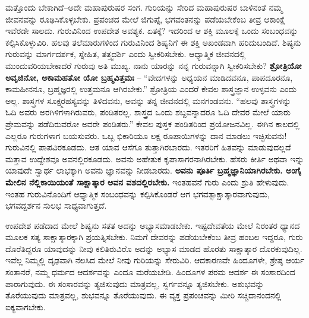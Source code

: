 ಮತ್ತೊಂದು ಬೇಕಾಗಿದೆ–ಅದೇ ಮಹಾಪುರುಷರ ಸಂಗ. ಗುರಿಯನ್ನು ಸೇರಿದ ಮಹಾಪುರುಷರ ಬಾಳಿನಂತೆ ನಮ್ಮ ಜೀವನವನ್ನು ರೂಢಿಸಿಕೊಳ್ಳಬೇಕು. ಪ್ರಪಂಚದ ಮೇಲೆ ಜಿಗುಪ್ಸೆ, ಭಗವಂತನನ್ನು ಪಡೆಯಬೇಕೆಂಬ ತೀವ್ರ ಆಕಾಂಕ್ಷೆ ಇವೆರಡೇ ಸಾಲದು. ಗುರುವಿನಿಂದ ಉಪದೇಶ ಅವಶ್ಯಕ. ಏತಕ್ಕೆ? ಇದರಿಂದ ಆ ಶಕ್ತಿ ಮೂಲಕ್ಕೆ ಒಂದು ಸಂಬಂಧವನ್ನು ಕಲ್ಪಿಸಿಕೊಳ್ಳುವಿರಿ. ಹಲವು ತಲೆಮಾರುಗಳಿಂದ ಗುರುವಿನಿಂದ ಶಿಷ್ಯನಿಗೆ ಈ ಶಕ್ತಿ ಅಖಂಡವಾಗಿ ಹರಿದುಬಂದಿದೆ. ಶಿಷ್ಯನು ಗುರುವನ್ನು ಮಾರ್ಗದರ್ಶಕ, ಸ್ನೇಹಿತ, ತತ್ತ್ವದರ್ಶಿ ಎಂದು ಸ್ವೀಕರಿಸಬೇಕು. ಆಧ್ಯಾತ್ಮಿಕ ಜೀವನದಲ್ಲಿ ಮುಂದುವರಿಯಬೇಕಾದರೆ ಗುರುವು ಅತಿ ಮುಖ್ಯ. ನಾನು ಯಾರನ್ನು ನನ್ನ ಗುರುವನ್ನಾಗಿ ಸ್ವೀಕರಿಸಬೇಕು? \textbf{ಶ್ರೋತ್ರಿಯೋ ಅವೃಜಿನೋ, ಅಕಾಮಹತೋ ಯೋ ಬ್ರಹ್ಮವಿತ್ತಮಃ} – “ವೇದಗಳನ್ನು ಅಧ್ಯಯನ ಮಾಡಿದವನೂ, ಪಾಪದೂರನೂ, ಕಾಮಹೀನನೂ, ಬ್ರಹ್ಮಜ್ಞರಲ್ಲಿ ಉತ್ತಮನೂ ಆಗಿರಬೇಕು.” ಶ್ರೋತ್ರಿಯ ಎಂದರೆ ಕೇವಲ ಶಾಸ್ತ್ರಜ್ಞಾನ ಉಳ್ಳವನು ಎಂದು ಅಲ್ಲ. ಶಾಸ್ತ್ರಗಳ ಸೂಕ್ಷ್ಮರಹಸ್ಯವನ್ನು ತಿಳಿದವನು, ಅವನ್ನು ತನ್ನ ಜೀವನದಲ್ಲಿ ಮನಗಂಡವನು. “ಹಲವು ಶಾಸ್ತ್ರಗಳನ್ನು ಓದಿ ಅವರು ಅರಗಿಳಿಗಳಾಗಿರುವರು, ಪಂಡಿತರಲ್ಲ. ಶಾಸ್ತ್ರದ ಒಂದು ಶಬ್ದವನ್ನಾದರೂ ಓದಿ ದೇವರ ಮೇಲೆ ಯಾರು ಪ್ರೇಮವನ್ನು ಪಡೆದಿರುವರೋ ಅವರೇ ಪಂಡಿತರು.” ಕೇವಲ ಪುಸ್ತಕ ಪಂಡಿತರಿಂದ ಪ್ರಯೋಜನವಿಲ್ಲ. ಈಗಿನ ಕಾಲದಲ್ಲಿ ಎಲ್ಲರೂ ಗುರುಗಳಾಗ ಬಯಸುವರು. ಒಬ್ಬ ಭಿಕಾರಿಯೂ ಲಕ್ಷ ರೂಪಾಯಿಗಳನ್ನು ದಾನ ಮಾಡಲು ಇಚ್ಛಿಸುವನು! ಗುರುವಿನಲ್ಲಿ ಪಾಪವಿರಕೂಡದು. ಆತ ಯಾವ ಆಸೆಗೂ ತುತ್ತಾಗಿರಬಾರದು. ಇತರರಿಗೆ ಹಿತವನ್ನು ಮಾಡುವುದಲ್ಲದೆ ಮತ್ತಾವ ಉದ್ದೇಶವೂ ಅವನಲ್ಲಿರಕೂಡದು. ಅವನು ಅಹೇತುಕ ಕೃಪಾಸಾಗರನಾಗಿರಬೇಕು. ಹೆಸರು ಕೀರ್ತಿ ಅಥವಾ ಇನ್ನು ಯಾವುದೇ ಸ್ವಾರ್ಥ ಲಾಭಕ್ಕಾಗಿ ಅವನು ಜ್ಞಾನವನ್ನು ನೀಡಬಾರದು. \textbf{ಅವನು ಪೂರ್ತಿ ಬ್ರಹ್ಮಜ್ಞಾನಿಯಾಗಿರಬೇಕು. ಅಂಗೈ ಮೇಲಿನ ನೆಲ್ಲಿಕಾಯಿಯಂತೆ ಸಾಕ್ಷಾತ್ಕಾರ ಅವನ ವಶದಲ್ಲಿರಬೇಕು.} ಇಂತಹವನೆ ಗುರು ಎಂದು ಶ್ರುತಿ ಹೇಳುವುದು. ಇಂತಹ ಗುರುವಿನೊಂದಿಗೆ ಆಧ್ಯಾತ್ಮಿಕ ಸಂಬಂಧವನ್ನು ಕಲ್ಪಿಸಿಕೊಂಡರೆ ಆಗ ಭಗವತ್ಸಾಕ್ಷಾತ್ಕಾರವಾಗುವುದು, ಭಗವದ್ದರ್ಶನ ಸುಲಭ ಸಾಧ್ಯವಾಗುತ್ತದೆ.

\vskip 5pt

ಉಪದೇಶ ಪಡೆದಾದ ಮೇಲೆ ಶಿಷ್ಯನು ಸತತ ಅದನ್ನು ಅಭ್ಯಾಸಮಾಡಬೇಕು. ಇಷ್ಟದೇವತೆಯ ಮೇಲೆ ನಿರಂತರ ಧ್ಯಾನದ ಮೂಲಕ ಸತ್ಯ ಸಾಕ್ಷಾತ್ಕಾರಕ್ಕಾಗಿ ಪ್ರಯತ್ನಿಸಬೇಕು. ನಿಮಗೆ ದೇವರನ್ನು ಪಡೆಯಬೇಕೆಂಬ ತೀವ್ರ ಹಂಬಲ ಇದ್ದರೂ, ಗುರು ದೊರೆತಿದ್ದರೂ ಯಾವುದನ್ನು ನೀವು ಕಲಿತಿರುವಿರೊ ಅದನ್ನು ಅಭ್ಯಾಸ ಮಾಡದ ಹೊರತು ಸಾಕ್ಷಾತ್ಕಾರ ದೊರಕುವುದಿಲ್ಲ. ಇವೆಲ್ಲ ನಿಮ್ಮಲ್ಲಿ ದೃಢವಾಗಿ ನೆಲಸಿದ ಮೇಲೆ ನೀವು ಗುರಿಯನ್ನು ಸೇರುವಿರಿ. ಆದಕಾರಣವೇ ಹಿಂದೂಗಳೇ, ಶ್ರೇಷ್ಠ ಆರ್ಯ ಸಂತಾನರೆ, ನಮ್ಮ ಧರ್ಮದ ಆದರ್ಶವನ್ನು ಎಂದೂ ಮರೆಯಬೇಡಿ. ಹಿಂದೂಗಳ ಪರಮ ಆದರ್ಶ ಈ ಸಂಸಾರದಿಂದ ಪಾರಾಗುವುದು. ಈ ಸಂಸಾರವನ್ನು ತ್ಯಜಿಸುವುದು ಮಾತ್ರವಲ್ಲ, ಸ್ವರ್ಗವನ್ನೂ ತ್ಯಜಿಸಬೇಕು. ಅಶುಭವನ್ನು ತೊರೆಯುವುದು ಮಾತ್ರವಲ್ಲ, ಶುಭವನ್ನೂ ತೊರೆಯುವುದು. ಈ ವ್ಯಕ್ತ ಪ್ರಪಂಚವನ್ನು ಮೀರಿ ಸಚ್ಚಿದಾನಂದನಲ್ಲಿ ಐಕ್ಯವಾಗಬೇಕು.

